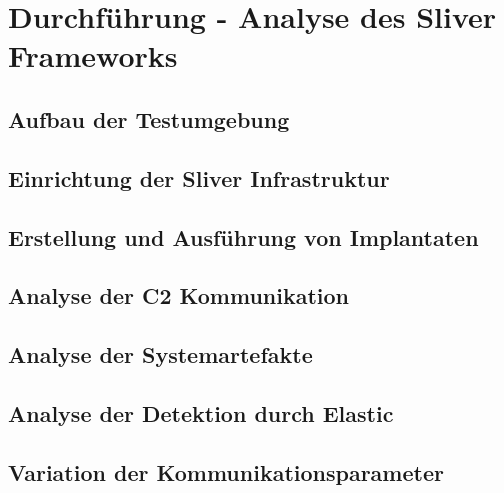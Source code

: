 \section{Durchführung - Analyse des Sliver Frameworks}
\subsection{Aufbau der Testumgebung}
\subsection{Einrichtung der Sliver Infrastruktur}
\subsection{Erstellung und Ausführung von Implantaten}
\subsection{Analyse der C2 Kommunikation}
\subsection{Analyse der Systemartefakte}
\subsection{Analyse der Detektion durch Elastic}
\subsection{Variation der Kommunikationsparameter}
